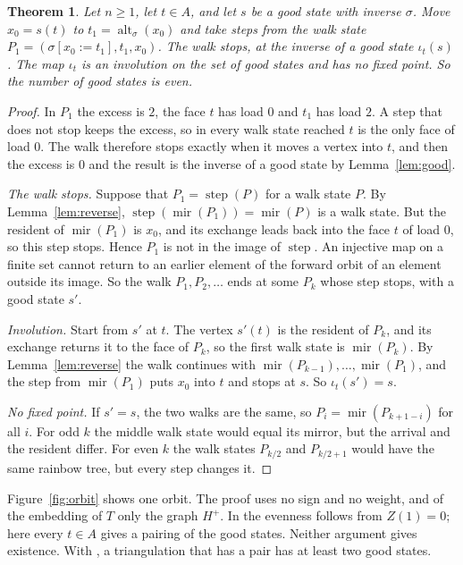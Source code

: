 \documentclass[10pt]{amsart}
\numberwithin{equation}{section}
\newtheorem{theorem}[equation]{Theorem}
\theoremstyle{definition}
\theoremstyle{remark}
\newcommand{\alt}{\operatorname{alt}}
\newcommand{\step}{\operatorname{step}}
\newcommand{\mirror}{\operatorname{mir}}
\newcommand{\Hp}{H^{+}}
\begin{document}
\begin{theorem}\label{thm:even}
Let $n\ge1$, let $t\in A$, and let $s$ be a good state with inverse $\sigma$.
Move $x_0=s(t)$ to $t_1=\alt_\sigma(x_0)$ and take steps from the walk state $P_1=(\sigma[x_0:=t_1],t_1,x_0)$.
The walk stops, at the inverse of a good state $\iota_t(s)$.
The map $\iota_t$ is an involution on the set of good states and has no fixed point.
So the number of good states is even.
\end{theorem}

\begin{proof}
In $P_1$ the excess is $2$, the face $t$ has load $0$ and $t_1$ has load $2$.
A step that does not stop keeps the excess, so in every walk state reached $t$ is the only face of load $0$.
The walk therefore stops exactly when it moves a vertex into $t$, and then the excess is $0$ and the result is the inverse of a good state by Lemma~\ref{lem:good}.

\emph{The walk stops.}
Suppose that $P_1=\step(P)$ for a walk state $P$.
By Lemma~\ref{lem:reverse}, $\step(\mirror(P_1))=\mirror(P)$ is a walk state.
But the resident of $\mirror(P_1)$ is $x_0$, and its exchange leads back into the face $t$ of load $0$, so this step stops.
Hence $P_1$ is not in the image of $\step$.
An injective map on a finite set cannot return to an earlier element of the forward orbit of an element outside its image.
So the walk $P_1,P_2,\dots$ ends at some $P_k$ whose step stops, with a good state $s'$.

\emph{Involution.}
Start from $s'$ at $t$.
The vertex $s'(t)$ is the resident of $P_k$, and its exchange returns it to the face of $P_k$, so the first walk state is $\mirror(P_k)$.
By Lemma~\ref{lem:reverse} the walk continues with $\mirror(P_{k-1}),\dots,\mirror(P_1)$, and the step from $\mirror(P_1)$ puts $x_0$ into $t$ and stops at $s$.
So $\iota_t(s')=s$.

\emph{No fixed point.}
If $s'=s$, the two walks are the same, so $P_i=\mirror(P_{k+1-i})$ for all $i$.
For odd $k$ the middle walk state would equal its mirror, but the arrival and the resident differ.
For even $k$ the walk states $P_{k/2}$ and $P_{k/2+1}$ would have the same rainbow tree, but every step changes it.
\end{proof}

Figure~\ref{fig:orbit} shows one orbit.
The proof uses no sign and no weight, and of the embedding of $T$ only the graph $\Hp$.
In \cite{Paper} the evenness follows from $Z(1)=0$; here every $t\in A$ gives a pairing of the good states.
Neither argument gives existence.
With \cite[Proposition~6.9]{Paper}, a triangulation that has a pair has at least two good states.
\end{document}
